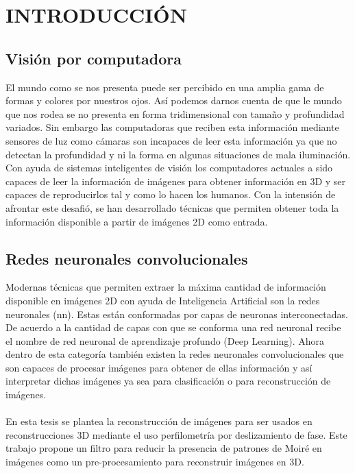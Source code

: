 \documentclass[10pt,letterpaper]{article}
\begin{document}
\newpage
\section{INTRODUCCIÓN}
\subsection{Visión por computadora}
El mundo como se nos presenta puede ser percibido en una amplia gama de formas y colores por nuestros ojos. Así podemos darnos cuenta de que le mundo que nos rodea se no presenta en forma tridimensional con tamaño y profundidad variados. Sin embargo las computadoras que reciben esta información mediante sensores de luz como cámaras son incapaces de leer esta información ya que no detectan la profundidad y ni la forma en algunas situaciones de mala iluminación. Con ayuda de sistemas inteligentes de visión los computadores actuales a sido capaces de leer la información de imágenes para obtener información en 3D y ser capaces de reproducirlos tal y como lo hacen los humanos. Con la intensión de afrontar este desafió, se han desarrollado técnicas que permiten obtener toda la información disponible a partir de imágenes 2D como entrada.

\subsection{Redes neuronales convolucionales}
Modernas técnicas que permiten extraer la máxima cantidad de información disponible en imágenes 2D con ayuda de Inteligencia Artificial son la redes neuronales (nn). Estas están conformadas por capas de neuronas interconectadas. De acuerdo a la cantidad de capas con que se conforma una red neuronal recibe el nombre de red neuronal de aprendizaje profundo (Deep Learning). Ahora dentro de esta categoría también existen la redes neuronales convolucionales que son capaces de procesar imágenes para obtener de ellas información y así interpretar dichas imágenes ya sea para clasificación o para reconstrucción de imágenes.
\\\\
En esta tesis se plantea la reconstrucción de imágenes para ser usados en reconstrucciones 3D mediante el uso perfilometría por deslizamiento de fase. Este trabajo propone un filtro para reducir la presencia de patrones de Moiré en imágenes como un pre-procesamiento para reconstruir imágenes en 3D.
\end{document}
